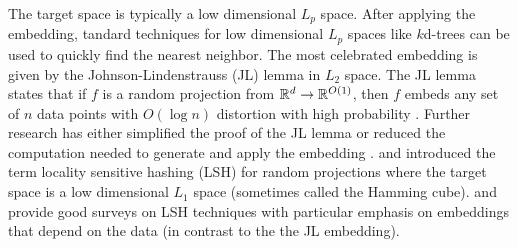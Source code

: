 \documentclass[../main.tex]{subfiles}
\begin{document}
The target space is typically a low dimensional $L_p$ space.
After applying the embedding,
tandard techniques for low dimensional $L_p$ spaces like $k$d-trees can be used to quickly find the nearest neighbor.
The most celebrated embedding is given by the Johnson-Lindenstrauss (JL) lemma in $L_2$ space.
The JL lemma states that if $f$ is a random projection from $\mathbb R^d \to \mathbb R^{O(1)}$, 
then $f$ embeds any set of $n$ data points with $O(\log n)$ distortion with high probability \citep{johnson1984extensions}.
Further research has either simplified the proof of the JL lemma \citep{dasgupta2003elementary,baraniuk2008simple} or reduced the computation needed to generate and apply the embedding \citep{achlioptas2001database}.
\citet{indyk1998approximate} and \citet{gionis1999similarity} introduced the term locality sensitive hashing (LSH) for random projections where the target space is a low dimensional $L_1$ space 
(sometimes called the Hamming cube). 
\cite{wang2014hashing} and \cite{wang2016learning} provide good surveys on LSH techniques with particular emphasis on embeddings that depend on the data (in contrast to the the JL embedding).
\end{document}
